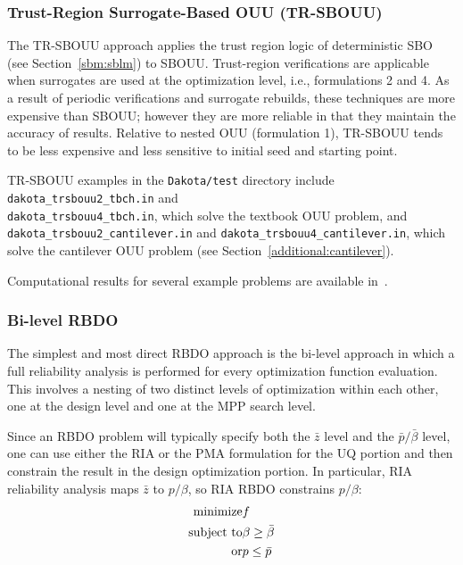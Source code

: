 \subsubsection{Trust-Region Surrogate-Based OUU (TR-SBOUU)}\label{models:ex:ouu:trsb}

The TR-SBOUU approach applies the trust region logic of deterministic
SBO (see Section~\ref{sbm:sblm}) to SBOUU. Trust-region verifications
are applicable when surrogates are used at the optimization level,
i.e., formulations 2 and 4. As a result of periodic verifications and
surrogate rebuilds, these techniques are more expensive than SBOUU;
however they are more reliable in that they maintain the accuracy of
results. Relative to nested OUU (formulation 1), TR-SBOUU tends to be
less expensive and less sensitive to initial seed and starting point.

TR-SBOUU examples in the \texttt{Dakota/test} directory include
\texttt{dakota\_trsbouu2\_tbch.in} and\\
\texttt{dakota\_trsbouu4\_tbch.in}, which solve the textbook OUU
problem, and\\ \texttt{dakota\_trsbouu2\_cantilever.in} and
\texttt{dakota\_trsbouu4\_cantilever.in}, which solve the cantilever
OUU problem (see Section~\ref{additional:cantilever}).

Computational results for several example problems are available
in~\cite{Eld02}.

\subsubsection{Bi-level RBDO} \label{models:ex:ouu:bilev_rbdo}

The simplest and most direct RBDO approach is the bi-level approach in
which a full reliability analysis is performed for every optimization
function evaluation.  This involves a nesting of two distinct levels
of optimization within each other, one at the design level and one at
the MPP search level.

Since an RBDO problem will typically specify both the $\bar{z}$ level
and the $\bar{p}/\bar{\beta}$ level, one can use either the RIA or the
PMA formulation for the UQ portion and then constrain the result in
the design optimization portion.  In particular, RIA reliability
analysis maps $\bar{z}$ to $p/\beta$, so RIA RBDO constrains $p/\beta$:
\begin{eqnarray}
  {\rm minimize }     & f \nonumber \\
  {\rm subject \ to } & \beta \ge \bar{\beta} \nonumber \\
  {\rm or }           & p \le \bar{p} \label{eq:rbdo_ria}
\end{eqnarray}

